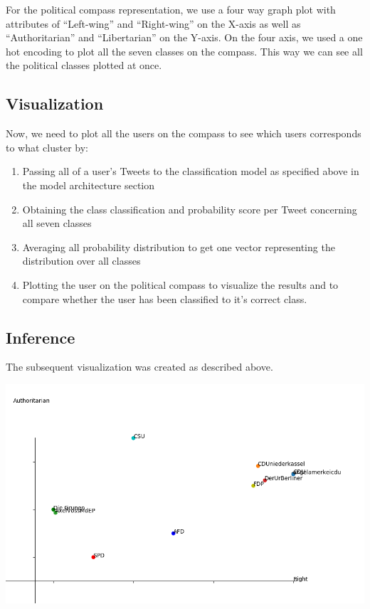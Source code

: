 \documentclass[10pt, oneside]{article}
\newenvironment{Figure}
	{\par\medskip\noindent\minipage{\linewidth}}
	{\endminipage\par\medskip}
\begin{document}
\begin{multicols}{2}
For the political compass representation, we use a four way graph plot with attributes of ``Left-wing'' and ``Right-wing'' on the X-axis as well as  ``Authoritarian'' and ``Libertarian'' on the Y-axis. On the four axis, we used a one hot encoding to plot all the seven classes on the compass. This way we can see all the political classes plotted at once.

\subsection{Visualization}

Now, we need to plot all the users on the compass to see which users corresponds to what cluster by:
\begin{enumerate}
	\item Passing all of a user's Tweets to the classification model as specified above in the model architecture section
	\item Obtaining the class classification and probability score per Tweet concerning all seven classes
	\item Averaging all probability distribution to get one vector representing the distribution over all classes
	\item Plotting the user on the political compass to visualize the results and to compare whether the user has been classified to it’s correct class.
\end{enumerate}

\subsection{Inference}

The subsequent visualization was created as described above.

\begin{Figure}
	\centering
	\includegraphics[width=\linewidth]{images/Political_Compass.png}
\end{Figure}




\end{multicols}
\end{document}
